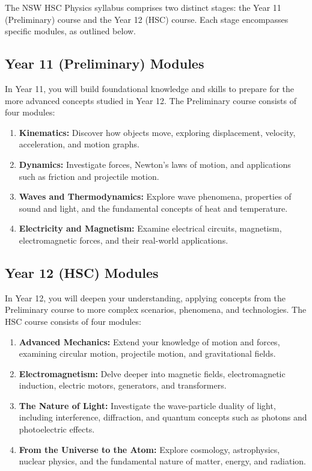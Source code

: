The NSW HSC Physics syllabus comprises two distinct stages: the Year 11 (Preliminary) course and the Year 12 (HSC) course. Each stage encompasses specific modules, as outlined below.

\subsection{Year 11 (Preliminary) Modules}
\FloatBarrier

In Year 11, you will build foundational knowledge and skills to prepare for the more advanced concepts studied in Year 12. The Preliminary course consists of four modules:

\begin{enumerate}
\item \textbf{Kinematics:} Discover how objects move, exploring displacement, velocity, acceleration, and motion graphs.
\item \textbf{Dynamics:} Investigate forces, Newton's laws of motion, and applications such as friction and projectile motion.
\item \textbf{Waves and Thermodynamics:} Explore wave phenomena, properties of sound and light, and the fundamental concepts of heat and temperature.
\item \textbf{Electricity and Magnetism:} Examine electrical circuits, magnetism, electromagnetic forces, and their real-world applications.
\end{enumerate}

\subsection{Year 12 (HSC) Modules}
\FloatBarrier

In Year 12, you will deepen your understanding, applying concepts from the Preliminary course to more complex scenarios, phenomena, and technologies. The HSC course consists of four modules:

\begin{enumerate}
\item \textbf{Advanced Mechanics:} Extend your knowledge of motion and forces, examining circular motion, projectile motion, and gravitational fields.
\item \textbf{Electromagnetism:} Delve deeper into magnetic fields, electromagnetic induction, electric motors, generators, and transformers.
\item \textbf{The Nature of Light:} Investigate the wave-particle duality of light, including interference, diffraction, and quantum concepts such as photons and photoelectric effects.
\item \textbf{From the Universe to the Atom:} Explore cosmology, astrophysics, nuclear physics, and the fundamental nature of matter, energy, and radiation.
\end{enumerate}

